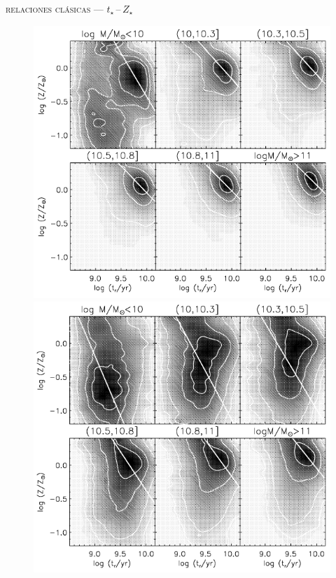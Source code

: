 \documentclass[xcolor=dvipsnames,4pt,hyperref={colorlinks,citecolor=black,linkcolor=black,urlcolor=black}]{beamer}
\begin{document}
\begin{frame}{\textsc{relaciones clásicas --- $t_\star\,$--$\,Z_\star$}}



\begin{figure}
\includegraphics[scale=0.7]{img/gallazzi2005-12}
\includegraphics[scale=0.7]{img/gallazzi2005-11}
\end{figure}


\end{frame}
\end{document}
